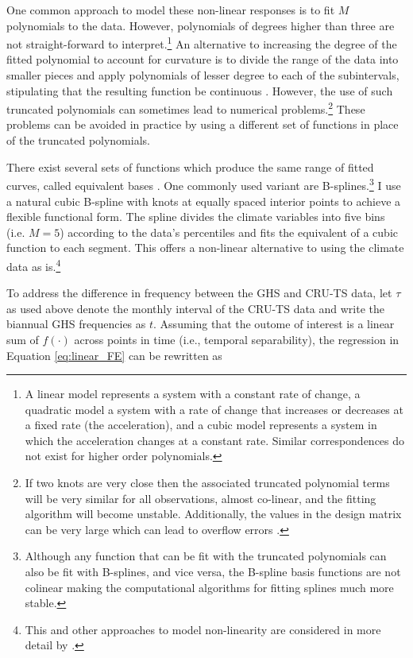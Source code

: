 \documentclass[a4paper,12pt]{article}
\theoremstyle{plain}
\theoremstyle{definition}
\theoremstyle{definition}
\theoremstyle{definition}
\theoremstyle{definition}
\begin{document}
One common approach to model these non-linear responses is to fit $M$ polynomials to the data. However, polynomials of degrees higher than three are not straight-forward to interpret.\footnote{A linear model represents a system with a constant rate of change, a quadratic model a system with a rate of change that increases or decreases at a fixed rate (the acceleration), and a cubic model represents a system in which the acceleration changes at a constant rate. Similar correspondences do not exist for higher order polynomials.} An alternative to increasing the degree of the fitted polynomial to account for curvature is to divide the range of the data into smaller pieces and apply polynomials of lesser degree to each of the subintervals, stipulating that the resulting function be continuous \citep[see e.g.][pp. 275- 279]{greene2018}. However, the use of such truncated polynomials can sometimes lead to numerical problems.\footnote{If two knots are very close then the associated truncated polynomial terms will be very similar for all observations, almost co-linear, and the fitting algorithm will become unstable. Additionally, the values in the design matrix can be very large which can lead to overflow errors \citep[see e.g.,][]{hastie2009a}.} These problems can be avoided in practice by using a different set of functions in place of the truncated polynomials.

There exist several sets of functions which produce the same range of fitted curves, called equivalent bases \citep{hastie1987,hastie2009a}. One commonly used variant are B-splines.\footnote{Although any function that can be fit with the truncated polynomials can also be fit with B-splines, and vice versa, the B-spline basis functions are not colinear making the computational algorithms for fitting splines much more stable.} I use a natural cubic B-spline with knots at equally spaced interior points to achieve a flexible functional form. The spline divides the climate variables into five bins (i.e. $M=5$) according to the data's percentiles and fits the equivalent of a cubic function to each segment. This offers a non-linear alternative to using the climate data as is.\footnote{This and other approaches to model non-linearity are considered in more detail by \citet[][p. 18-19]{Hsiang2016a}.}

To address the difference in frequency between the GHS and CRU-TS data, let $\tau$ as used above denote the monthly interval of the CRU-TS data and write the biannual GHS frequencies as $t$. Assuming that the outome of interest is a linear sum of $f(\cdot)$ across points in time (i.e., temporal separability), the regression in Equation \ref{eq:linear_FE} can be rewritten as 
\end{document}
